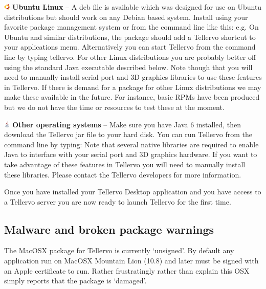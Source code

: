 \begin{description}
\item \includegraphics[width=3mm]{Images/ubuntu.png} \textbf{Ubuntu Linux} --  A deb file is available which was designed for use on Ubuntu distributions but should work on any Debian based system. Install using your favorite package management system or from the command line like this: e.g.  On Ubuntu and similar distributions, the package should add a Tellervo shortcut to your applications menu. Alternatively you can start Tellervo from the command line by typing tellervo.  For other Linux distributions you are probably better off using the standard Java executable described below.  Note though that you will need to manually install serial port and 3D graphics libraries to use these features in Tellervo.  If there is demand for a package for other Linux distributions we may make these available in the future.  For instance, basic RPMs have been produced but we do not have the time or resources to test these at the moment.

\item \includegraphics[width=3mm]{Images/java.png} \textbf{Other operating systems} -- Make sure you have Java 6 installed, then download the Tellervo jar file to your hard disk. You can run Tellervo from the command line by typing:   Note that several native libraries are required to enable Java to interface with your serial port and 3D graphics hardware.  If you want to take advantage of these features in Tellervo you will need to manually install these libraries.  Please contact the Tellervo developers for more information.
\end{description}

Once you have installed your Tellervo Desktop application and you have access to a Tellervo server you are now ready to launch Tellervo for the first time.


\subsection{Malware and broken package warnings}
\label{txt:malware}

The MacOSX package for Tellervo is currently `unsigned'.  By default any application run on MacOSX Mountain Lion (10.8) and later must be signed with an Apple certificate to run.  Rather frustratingly rather than explain this OSX simply reports that the package is `damaged'.

